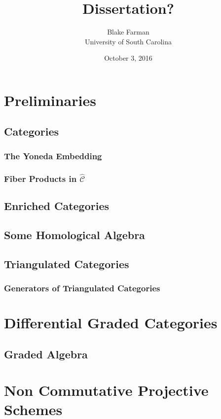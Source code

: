\documentclass[10pt]{book}
\author{Blake Farman\\University of South Carolina}
\title{Dissertation?}
\date{October 3, 2016}
\begin{document}

\tableofcontents

\newtheorem{thm}{Theorem}[section]
\newtheorem{lem}[thm]{Lemma}
\newtheorem{cor}[thm]{Corollary}
\newtheorem{prop}[thm]{Proposition}

\theoremstyle{definition}
\newtheorem{defn}[thm]{Definition}
\newtheorem{rmk}[thm]{Remark}
\newtheorem{eg}[thm]{Example}

\chapter{Preliminaries}
\section{Categories}
%
\subsection{The Yoneda Embedding}
\subsection{Fiber Products in $\hat{\mathscr{C}}$} %
%
\section{Enriched Categories}



\section{Some Homological Algebra}

\section{Triangulated Categories}
%
%
\subsection{Generators of Triangulated Categories}
%
\chapter{Differential Graded Categories}

\section{Graded Algebra}

\chapter{Non Commutative Projective Schemes}
%

\end{document}
